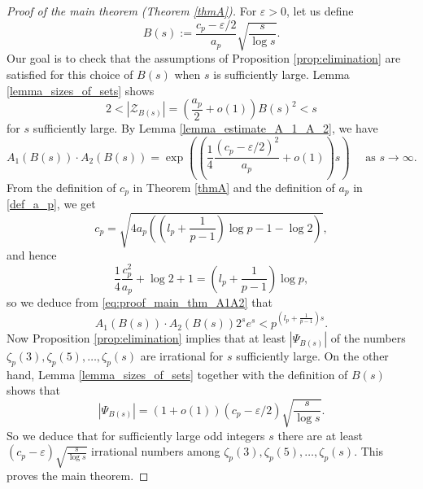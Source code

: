\documentclass[12pt]{article}
\numberwithin{equation}{section}
\begin{document}
\begin{proof}[Proof of the main theorem (Theorem \ref{thmA})]
For $\varepsilon>0$, let us define
\[
    B(s):=\frac{c_p-\varepsilon/2}{a_p}\sqrt{\frac{s}{\log s}}.
\]
Our goal is to check that the assumptions of Proposition \ref{prop:elimination} are satisfied for this choice of $B(s)$ when $s$ is sufficiently large. Lemma \ref{lemma_sizes_of_sets} shows
\[
    2 < |\mathcal{Z}_{B(s)}| = \left( \frac{a_p}{2} + o(1)\right)B(s)^2<s
\]
for $s$ sufficiently large. By Lemma \ref{lemma_estimate_A_1_A_2}, we have
\begin{equation}\label{eq:proof_main_thm_A1A2}
    A_1(B(s))\cdot A_2(B(s))=\exp\left( \left( \frac{1}{4}\frac{(c_p-\varepsilon/2)^2}{a_p} +o(1) \right)s \right)\quad \text{ as } s\to \infty.
\end{equation}
From the definition of $c_p$ in Theorem \ref{thmA} and the definition of $a_p$ in \eqref{def_a_p}, we get
\[
    c_p=\sqrt{4a_p \left(\left(l_p+\frac{1}{p-1}\right)\log p -1-\log 2\right)},
\]
and hence
\[
    \frac{1}{4}\frac{c_p^2}{a_p} +\log2+1=\left( l_p +\frac{1}{p-1}\right)\log p,
\]
so we deduce from \eqref{eq:proof_main_thm_A1A2} that
\[
    A_1(B(s))\cdot A_2(B(s))2^s e^s <p^{\left(l_p+\frac{1}{p-1}\right)s}.
\]
Now Proposition \ref{prop:elimination} implies that at least $|\Psi_{B(s)}|$ of the numbers $\zeta_p(3),\zeta_p(5),\dots,\zeta_p(s)$ are irrational for $s$ sufficiently large. On the other hand, Lemma \ref{lemma_sizes_of_sets} together with the definition of $B(s)$ shows that
\[
    |\Psi_{B(s)}|=(1+o(1)) (c_p-\varepsilon/2)\sqrt{\frac{s}{\log s}}.
\]
So we deduce that for sufficiently large odd integers $s$ there are at least $(c_p-\varepsilon)\sqrt{\frac{s}{\log s}}$ irrational numbers among $\zeta_p(3),\zeta_p(5),\dots,\zeta_p(s)$. This proves the main theorem.
\end{proof}


\bigskip


\end{document}
